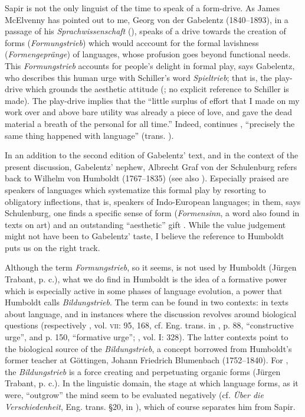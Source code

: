 \documentclass[output=paper]{langscibook}
\begin{document}
Sapir is not the only linguist of the time to speak of a form-drive. As James McElvenny has pointed out to me, Georg von der Gabelentz (1840--1893), in a passage of his \emph{Sprachwissenschaft} (\citeyear{Gabelentz20161891}), speaks of a drive towards the creation of forms (\emph{Formungstrieb}) which would acccount for the formal lavishness (\emph{Formengepränge}) of languages, whose profusion goes beyond functional needs. This \emph{Formungstrieb} accounts for people's delight in formal play, says Gabelentz, who describes this human urge with Schiller's word \emph{Spieltrieb}; that is, the play-drive which grounds the aesthetic attitude (\citealt[381]{Gabelentz20161891}; no explicit reference to Schiller is made). The play-drive implies that the ``little surplus of effort that I made on my work over and above bare utility was already a piece of love, and gave the dead material a breath of the personal for all time.'' Indeed, continues \citet[344]{Gabelentz20161891}, ``precisely the same thing happened with language'' (trans. \citealt[35]{McElvenny2016}).

In an addition to the second edition of Gabelentz' text, and in the context of the present discussion, Gabelentz' nephew, Albrecht Graf von der Schulenburg refers back to Wilhelm von Humboldt (1767--1835) (see also \citealt{McElvenny2017a}). Especially praised are speakers of languages which systematize this formal play by resorting to obligatory inflections, that is, speakers of Indo-European languages; in them, says Schulenburg, one finds a specific sense of form (\emph{Formensinn}, a word also found in texts on art) and an outstanding ``aesthetic'' gift \citep[394]{Gabelentz20161891}. While the value judgement might not have been to Gabelentz' taste, I believe the reference to Humboldt puts us on the right track.

Although the term \emph{Formungstrieb}, so it seems, is not used by Humboldt (Jürgen Trabant, p. c.), what we do find in Humboldt is the idea of a formative power which is especially active in some phases of language evolution, a power that Humboldt calls \emph{Bildungstrieb}. The term can be found in two contexts: in texts about language, and in instances where the discussion revolves around biological questions (respectively \citealt{Humboldt1907}, vol. \textsc{vii}: 95, 168, cf. Eng. trans. in \citealt{Humboldt1988}, p. 88, ``constructive urge'', and p. 150, ``formative urge''; \citealt{Humboldt1903}, vol. I: 328). The latter contexts point to the biological source of the \emph{Bildungstrieb}, a concept borrowed from Humboldt's former teacher at Göttingen, Johann Friedrich Blumenbach (1752--1840). For \citet{Blumenbach1781}, the \emph{Bildungstrieb} is a force creating and perpetuating organic forms (Jürgen Trabant, p. c.). In the linguistic domain, the stage at which language forms, as it were, ``outgrow'' the mind seem to be evaluated negatively (cf. \emph{Über die Verschiedenheit}, Eng. trans. §20, in \citealt{Humboldt1988}), which of course separates him from Sapir.
\end{document}
